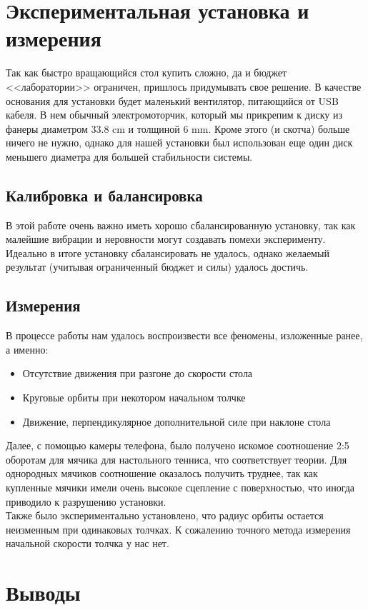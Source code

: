 \documentclass[a4paper,12pt]{article}
\begin{document}
	\section{Экспериментальная установка и измерения}
	Так как быстро вращающийся стол купить сложно, да и бюджет <<лаборатории>> ограничен, пришлось придумывать свое решение. В качестве основания для установки будет маленький вентилятор, питающийся от USB кабеля. В нем обычный электромоторчик, который мы прикрепим к диску из фанеры диаметром $33.8$ cm и толщиной $6$ mm. Кроме этого (и скотча) больше ничего не нужно, однако для нашей установки был использован еще один диск меньшего диаметра для большей стабильности системы.
	\subsection{Калибровка и балансировка}
	В этой работе очень важно иметь хорошо сбалансированную установку, так как малейшие вибрации и неровности могут создавать помехи эксперименту. Идеально в итоге установку сбалансировать не удалось, однако желаемый результат (учитывая ограниченный бюджет и силы) удалось достичь.
	\subsection{Измерения}
	В процессе работы нам удалось воспроизвести все феномены, изложенные ранее, а именно:
	\begin{itemize}
		\item Отсутствие движения при разгоне до скорости стола\\
		\item Круговые орбиты при некотором начальном толчке\\
		\item Движение, перпендикулярное дополнительной силе при наклоне стола
	\end{itemize}
	Далее, с помощью камеры телефона, было получено искомое соотношение 2:5 оборотам для мячика для настольного тенниса, что соответствует теории. Для однородных мячиков соотношение оказалось получить труднее, так как купленные мячики имели очень высокое сцепление с поверхностью, что иногда приводило к разрушению установки.\\
	
	Также было экспериментально установлено, что радиус орбиты остается неизменным при одинаковых толчках. К сожалению точного метода измерения начальной скорости толчка у нас нет.
	
	\section{Выводы}
\end{document}
